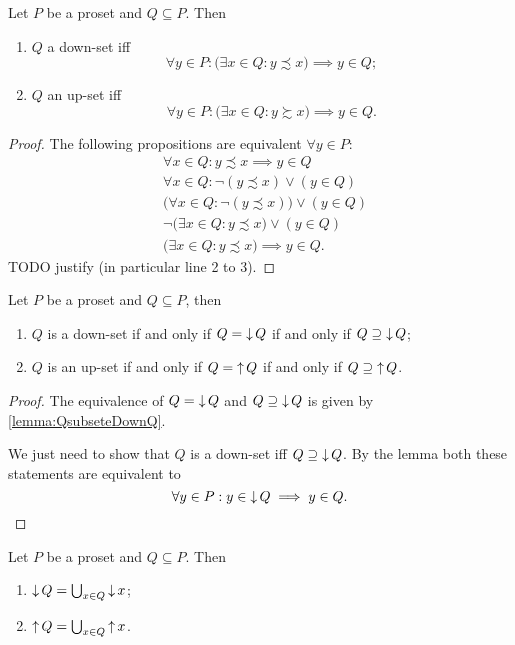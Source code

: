 \begin{lemma}
Let $P$ be a proset and $Q\subseteq P$. Then
\begin{enumerate}
\item $Q$ a down-set iff 
\[ \forall y\in P: \Big(\exists x\in Q:  y\precsim x\Big) \implies y\in Q; \]
\item $Q$ an up-set iff 
\[ \forall y\in P: \Big(\exists x\in Q:  y\succsim x\Big) \implies y\in Q. \]
\end{enumerate}
\end{lemma}
\begin{proof}
The following propositions are equivalent $\forall y\in P$:
\begin{align*}
&\forall x\in Q: y\precsim x \implies y\in Q \\
&\forall x\in Q: \neg(y\precsim x) \lor (y\in Q) \\
&\Big(\forall x\in Q: \neg(y\precsim x)\Big) \lor (y\in Q) \\
&\neg \Big(\exists x\in Q: y\precsim x \Big) \lor (y\in Q) \\
&\Big(\exists x\in Q:  y\precsim x\Big) \implies y\in Q.
\end{align*}
TODO justify (in particular line 2 to 3).
\end{proof}
\begin{corollary}
Let $P$ be a proset and $Q\subseteq P$, then
\begin{enumerate}
\item $Q$ is a down-set \textup{if and only if} $Q = \mathop{\downarrow} Q$ \textup{if and only if} $Q \supseteq \mathop{\downarrow} Q$;
\item $Q$ is an up-set \textup{if and only if} $Q = \mathop{\uparrow} Q$ \textup{if and only if} $Q \supseteq \mathop{\uparrow} Q$.
\end{enumerate}
\end{corollary}
\begin{proof}
The equivalence of $Q = \mathop{\downarrow} Q$ and $Q \supseteq \mathop{\downarrow} Q$ is given by \ref{lemma:QsubseteDownQ}.

We just need to show that $Q$ is a down-set iff $Q \supseteq \mathop{\downarrow} Q$. By the lemma both these statements are equivalent to
\[ \forall y\in P: y\in \mathop{\downarrow} Q \implies y\in Q. \]
\end{proof}

\begin{lemma}
Let $P$ be a proset and $Q\subseteq P$. Then
\begin{enumerate}
\item $\mathop{\downarrow} Q = \bigcup_{x\in Q}\mathop{\downarrow} x$;
\item $\mathop{\uparrow} Q = \bigcup_{x\in Q}\mathop{\uparrow} x$.
\end{enumerate}
\end{lemma}

